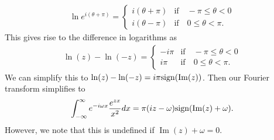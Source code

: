 \documentclass[
 amsmath,amssymb,
 aps,
onecolumn, 
nofootinbib]{revtex4-2}
\DeclareMathOperator{\im}{Im}
\begin{document}
\begin{align}
    \ln e^{i (\theta  +\pi)} = \begin{cases}
        i (\theta + \pi) & \text{if} \quad -\pi \le \theta < 0 \\
        i (\theta - \pi) & \text{if} \quad 0 \le \theta < \pi.
    \end{cases}
\end{align}
This gives rise to the difference in logarithms as
\begin{align}
    \ln (z) - \ln (-z) = \begin{cases}
        - i \pi & \text{if} \quad -\pi \le \theta < 0 \\
        i \pi & \text{if} \quad 0 \le \theta < \pi.
    \end{cases}
\end{align}
We can simplify this to $\ln(z) - \ln (-z) = i \pi {\rm sign}(\im(z))$. Then our Fourier transform simplifies to
\begin{align}
    \int_{-\infty}^{\infty} e^{-i \omega x} \frac{e^{z x}}{x^2} dx = \pi (i z - \omega)  {\rm sign}(\im (z) + \omega).
\end{align}
However, we note that this is undefined if $\im(z) + \omega = 0$. 
\end{document}
